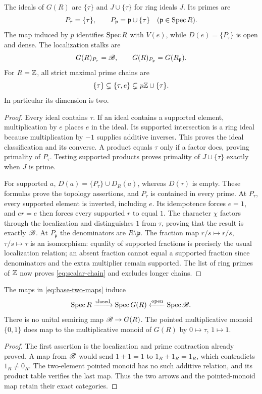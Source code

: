 \begin{theorem}\label{thm:rebuilt-scalar}
The ideals of $G(R)$ are $\{\tau\}$ and $J\cup\{\tau\}$ for ring ideals $J$. Its primes are
\[
 P_\tau=\{\tau\},\qquad P_{\mathfrak p}=\mathfrak p\cup\{\tau\}\quad(\mathfrak p\in\operatorname{Spec} R).
\]
The map induced by $p$ identifies $\operatorname{Spec} R$ with $V(e)$, while $D(e)=\{P_\tau\}$ is open and dense. The localization stalks are
\[
 G(R)_{P_\tau}=\mathscr B,\qquad G(R)_{P_{\mathfrak p}}=G(R_{\mathfrak p}).
\]
For $R=\mathbb Z$, all strict maximal prime chains are
\begin{equation}\label{eq:scalar-chain}
 \{\tau\}\subsetneq\{\tau,e\}\subsetneq p\mathbb Z\cup\{\tau\}.
\end{equation}
In particular its dimension is two.
\end{theorem}
\begin{proof}
Every ideal contains $\tau$. If an ideal contains a supported element, multiplication by $e$ places $e$ in the ideal. Its supported intersection is a ring ideal because multiplication by $-1$ supplies additive inverses. This proves the ideal classification and its converse. A product equals $\tau$ only if a factor does, proving primality of $P_\tau$. Testing supported products proves primality of $J\cup\{\tau\}$ exactly when $J$ is prime.

For supported $a$, $D(a)=\{P_\tau\}\cup D_R(a)$, whereas $D(\tau)$ is empty. These formulas prove the topology assertions, and $P_\tau$ is contained in every prime. At $P_\tau$, every supported element is inverted, including $e$. Its idempotence forces $e=1$, and $er=e$ then forces every supported $r$ to equal $1$. The character $\chi$ factors through the localization and distinguishes $1$ from $\tau$, proving that the result is exactly $\mathscr B$. At $P_{\mathfrak p}$ the denominators are $R\setminus\mathfrak p$. The fraction map $r/s\mapsto r/s$, $\tau/s\mapsto\tau$ is an isomorphism: equality of supported fractions is precisely the usual localization relation; an absent fraction cannot equal a supported fraction since denominators and the extra multiplier remain supported. The list of ring primes of $\mathbb Z$ now proves \eqref{eq:scalar-chain} and excludes longer chains.
\end{proof}

\begin{proposition}\label{prop:base-arrows}
The maps in \eqref{eq:base-two-maps} induce
\[
 \operatorname{Spec} R\xrightarrow{\text{closed}}\operatorname{Spec} G(R)
 \xleftarrow{\text{open}}\operatorname{Spec}\mathscr B.
\]
There is no unital semiring map $\mathscr B\to G(R)$. The pointed multiplicative monoid $\{0,1\}$ does map to the multiplicative monoid of $G(R)$ by $0\mapsto\tau$, $1\mapsto1$.
\end{proposition}
\begin{proof}
The first assertion is the localization and prime contraction already proved. A map from $\mathscr B$ would send $1+1=1$ to $1_R+1_R=1_R$, which contradicts $1_R\ne0_R$. The two-element pointed monoid has no such additive relation, and its product table verifies the last map. Thus the two arrows and the pointed-monoid map retain their exact categories.
\end{proof}

